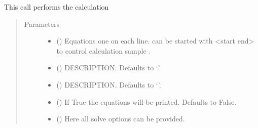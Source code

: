 \documentclass[letterpaper,10pt,english]{sphinxmanual}
\begin{document}
\begin{fulllineitems}
\begin{quote}
\begin{description}
\end{description}\end{quote}

\begin{fulllineitems}
\label{\detokenize{index:modelmf.mfcalc.__call__}}
\pysigstartsignatures
{}
\pysigstopsignatures
\sphinxAtStartPar
This call performs the calculation
\begin{quote}\begin{description}
\item[{Parameters}] \leavevmode\begin{itemize}
\item {} 
\sphinxAtStartPar
{} () \textendash{} Equations one on each line. can be started with \textless{}start end\textgreater{} to control calculation sample .

\item {} 
\sphinxAtStartPar
{} (\sphinxstyleliteralemphasis{\sphinxupquote{, }}) \textendash{} DESCRIPTION. Defaults to ‘’.

\item {} 
\sphinxAtStartPar
{} (\sphinxstyleliteralemphasis{\sphinxupquote{, }}) \textendash{} DESCRIPTION. Defaults to ‘’.

\item {} 
\sphinxAtStartPar
{} (\sphinxstyleliteralemphasis{\sphinxupquote{, }}) \textendash{} If True the equations will be printed. Defaults to False.

\item {} 
\sphinxAtStartPar
{} () \textendash{} Here all solve options can be provided.


\end{itemize}
\end{description}
\end{quote}
\end{fulllineitems}
\end{fulllineitems}
\end{document}
